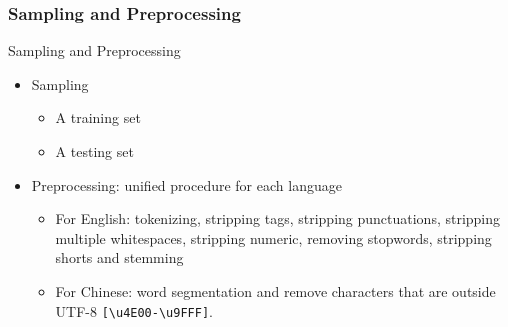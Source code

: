 \documentclass[mathserif]{beamer}
\begin{document}
\subsubsection{Sampling and Preprocessing}
\begin{frame}{Sampling and Preprocessing}
	\begin{itemize}
	\item Sampling
		\begin{itemize}
			\item A training set
			\item A testing set
		\end{itemize}
	\item Preprocessing: unified procedure for each language
		\begin{itemize}
			\item For English: tokenizing, stripping tags, stripping punctuations, stripping multiple whitespaces, stripping numeric, removing stopwords, stripping shorts and stemming
			\item For Chinese: word segmentation and remove characters that are outside UTF-8 \texttt{[\textbackslash u4E00-\textbackslash u9FFF]}.
		\end{itemize}
	\end{itemize}
\end{frame}
\end{document}
